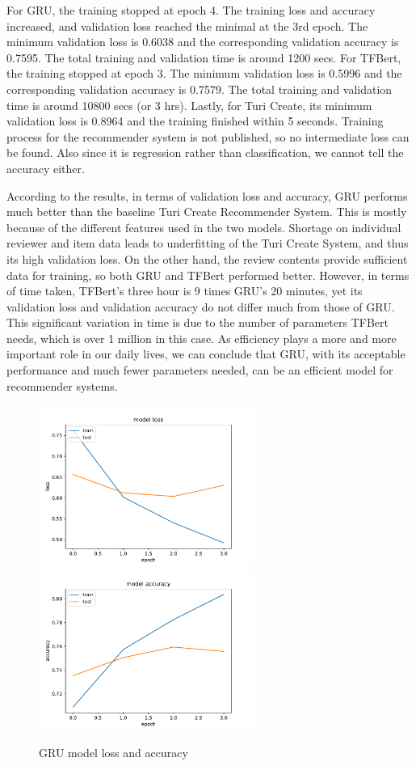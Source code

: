 \documentclass[12pt]{article}
\begin{document}
For GRU, the training stopped at epoch 4. The training loss and accuracy increased, and validation loss reached the minimal at the 3rd epoch. The minimum validation loss is 0.6038 and the corresponding validation accuracy is 0.7595. The total training and validation time is around 1200 secs. For TFBert, the training stopped at epoch 3. The minimum validation loss is 0.5996 and the corresponding validation accuracy is 0.7579. The total training and validation time is around 10800 secs (or 3 hrs). Lastly, for Turi Create, its minimum validation loss is 0.8964 and the training finished within 5 seconds. Training process for the recommender system is not published, so no intermediate loss can be found. Also since it is regression rather than classification, we cannot tell the accuracy either. 

According to the results, in terms of validation loss and accuracy, GRU performs much better than the baseline Turi Create Recommender System. This is mostly because of the different features used in the two models. Shortage on individual reviewer and item data leads to underfitting of the Turi Create System, and thus its high validation loss. On the other hand, the review contents provide sufficient data for training, so both GRU and TFBert performed better. However, in terms of time taken, TFBert’s three hour is 9 times GRU’s 20 minutes, yet its validation loss and validation accuracy do not differ much from those of GRU. This significant variation in time is due to the number of parameters TFBert needs, which is over 1 million in this case. As efficiency plays a more and more important role in our daily lives, we can conclude that GRU, with its acceptable performance and much fewer parameters needed, can be an efficient model for recommender systems.
\begin{figure}[h!]
    \centering
    \includegraphics[width=70mm,scale=0.5]{gru_loss.pdf}
    \includegraphics[width=70mm,scale=0.5]{gru_accuracy.pdf}
    \caption{GRU model loss and accuracy}
    \label{fig:gru}
    \vspace{-0.5cm}
\end{figure}
\end{document}
